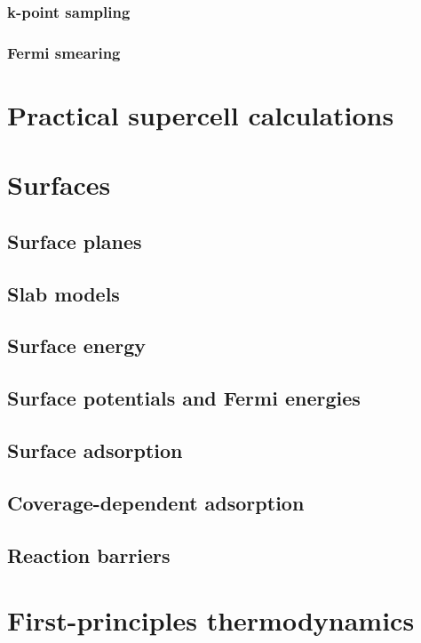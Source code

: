 \documentclass[11pt]{article}
\begin{document}
\subsubsection{k-point sampling}
\label{sec:org3f9fbb1}
\subsubsection{Fermi smearing}
\label{sec:orgb707dbe}
\newpage
\section{Practical supercell calculations}
\label{sec:org5c84cb2}
\newpage
\section{Surfaces}
\label{sec:org5201b12}
\subsection{Surface planes}
\label{sec:orgc766c1d}
\subsection{Slab models}
\label{sec:orgb38c0b0}
\subsection{Surface energy}
\label{sec:org37a9486}
\subsection{Surface potentials and Fermi energies}
\label{sec:org4676c69}
\subsection{Surface adsorption}
\label{sec:orgdf3c63b}
\subsection{Coverage-dependent adsorption}
\label{sec:orgeecc234}
\subsection{Reaction barriers}
\label{sec:orga90ee1a}

\newpage
\section{First-principles thermodynamics}
\label{sec:orgb2d30c1}
\end{document}

